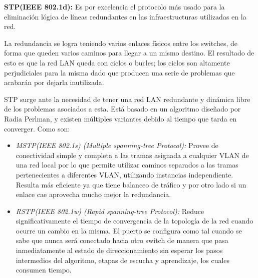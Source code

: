 \documentclass[a4paper,10pt]{article}
\begin{document}
\textbf{STP(IEEE 802.1d):} Es por excelencia el protocolo más usado para la eliminación lógica de líneas redundantes en las infraestructuras utilizadas en la red. 

La redundancia se logra teniendo varios enlaces físicos entre los switches, de forma que queden varios caminos para llegar a un mismo destino. El resultado de esto es que la red LAN queda con ciclos o bucles; los ciclos son altamente perjudiciales para la misma dado que producen una serie de problemas que acabarán por dejarla inutilizada.

STP surge ante la necesidad de tener una red LAN redundante y dinámica libre de los problemas asociados a esta.  Está basado en un algoritmo diseñado por Radia Perlman, y existen múltiples variantes debido al tiempo que tarda en converger.  Como son:
\begin{itemize}
	\item\textit{ MSTP(IEEE 802.1s) (Multiple spanning-tree Protocol):} Provee de conectividad simple y completa a las tramas asignada a cualquier VLAN de una red local por lo que permite utilizar caminos separados a las tramas pertenecientes a diferentes VLAN, utilizando instancias independiente. 
	Resulta más eficiente ya que tiene balanceo de tráfico y por otro lado si un enlace cae aprovecha mucho mejor la redundancia.
	\item \textit{RSTP(IEEE 802.1w) (Rapid spanning-tree Protocol):} Reduce significativamente el tiempo de convergencia de la topología de la red cuando ocurre un cambio en la misma. 
	El puerto se configura como tal cuando se sabe que nunca será conectado hacia otro switch de manera que pasa inmediatamente al estado de direccionamiento sin esperar los pasos intermedios del algoritmo, etapas de escucha y aprendizaje, los cuales consumen tiempo.
\end{itemize}
\end{document}
